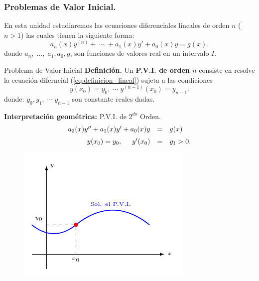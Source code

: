 \documentclass{beamer}
\begin{document}
\frame{\titlepage}

\begin{frame}[t]
	\frametitle{Problemas de Valor Inicial.}
	\begin{block}{}
		En esta unidad estudiaremos las ecuaciones diferenciales lineales de orden \(n\) (\(n>1\)) las cuales tienen la siguiente forma:
		\begin{equation}
			a_n(x) y^{(n)} + \;\cdots\; + a_1(x) y' +a_0(x) y=g(x).
			\label{eq:definicion_lineal}
		\end{equation}
		donde \(a_n, \;\ldots,\; a_1,a_0,g\), son funciones de valores real en un intervalo \(I\).
	\end{block} \vspace{5mm}
	\begin{block}{Problema de Valor Inicial}
		\textbf{Definición.} Un \textbf{P.V.I. de orden \(n\)} consiste en resolve la ecuación diferncial (\ref{eq:definicion_lineal}) sujeta a las condiciones
		\[
			y(x_0) = y_0, \;\cdots\; y^{(n-1)} (x_0) = y_{n-1}.
		\]
		donde: \(y_0,y_1, \;\cdots\; y_{n-1}\) son constante reales dadas.
	\end{block}
\end{frame}

\begin{frame}[t]
	\begin{block}{}
		\textbf{Interpretación geométrica:} P.V.I. de \(2^{do}\) Orden.
		\[
			\begin{array}{rcl}
				a_2(x) y'' +a_1(x) y' +a_0(x) y & = & g(x) \\[2mm]
				y(x_0) = y_0 , \hspace{5mm} y' (x_0) & = & y_1 >0.
			\end{array}
		\]
		\begin{figure}[ht]
			\centering
			\includegraphics[width= 0.6 \linewidth]{IMAGENES/1/tikz.pdf}
		\end{figure}
	\end{block}
\end{frame}
\end{document}

